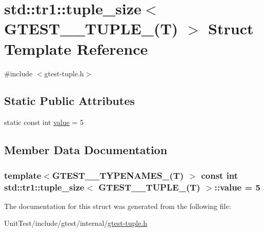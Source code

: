 \hypertarget{structstd_1_1tr1_1_1tuple__size_3_01_g_t_e_s_t__5___t_u_p_l_e___07_t_08_01_4}{\section{std\+:\+:tr1\+:\+:tuple\+\_\+size$<$ G\+T\+E\+S\+T\+\_\+\_\+\+T\+U\+P\+L\+E\+\_\+(T) $>$ Struct Template Reference}
\label{structstd_1_1tr1_1_1tuple__size_3_01_g_t_e_s_t__5___t_u_p_l_e___07_t_08_01_4}
}


{\ttfamily \#include $<$gtest-\/tuple.\+h$>$}

\subsection*{Static Public Attributes}
\begin{DoxyCompactItemize}
\item 
static const int \hyperlink{structstd_1_1tr1_1_1tuple__size_3_01_g_t_e_s_t__5___t_u_p_l_e___07_t_08_01_4_a83d207f8b8e95d9b747a586550feefcb}{value} = 5
\end{DoxyCompactItemize}


\subsection{Member Data Documentation}
\hypertarget{structstd_1_1tr1_1_1tuple__size_3_01_g_t_e_s_t__5___t_u_p_l_e___07_t_08_01_4_a83d207f8b8e95d9b747a586550feefcb}{
\subsubsection[{value}]{\setlength{\rightskip}{0pt plus 5cm}template$<$G\+T\+E\+S\+T\+\_\+\_\+\+T\+Y\+P\+E\+N\+A\+M\+E\+S\+\_\+(\+T) $>$ const int {\bf std\+::tr1\+::tuple\+\_\+size}$<$ {\bf G\+T\+E\+S\+T\+\_\+\_\+\+T\+U\+P\+L\+E\+\_\+}(T) $>$\+::value = 5\hspace{0.3cm}{\ttfamily [static]}}}\label{structstd_1_1tr1_1_1tuple__size_3_01_g_t_e_s_t__5___t_u_p_l_e___07_t_08_01_4_a83d207f8b8e95d9b747a586550feefcb}


The documentation for this struct was generated from the following file\+:\begin{DoxyCompactItemize}
\item 
Unit\+Test/include/gtest/internal/\hyperlink{gtest-tuple_8h}{gtest-\/tuple.\+h}\end{DoxyCompactItemize}
